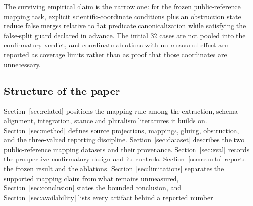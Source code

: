 The surviving empirical claim is the narrow one: for the frozen
public-reference mapping task, explicit scientific-coordinate conditions plus
an obstruction state reduce false merges relative to flat predicate
canonicalization while satisfying the false-split guard declared in advance.
The initial 32 cases are not pooled into the confirmatory verdict, and
coordinate ablations with no measured effect are reported as coverage limits
rather than as proof that those coordinates are unnecessary.

\subsection{Structure of the paper}

Section~\ref{sec:related} positions the mapping rule among the extraction,
schema-alignment, integration, stance and pluralism literatures it builds on.
Section~\ref{sec:method} defines source projections, mappings, gluing,
obstruction, and the three-valued reporting discipline. Section~\ref{sec:dataset}
describes the two public-reference mapping datasets and their provenance.
Section~\ref{sec:eval} records the prospective confirmatory design and its
controls. Section~\ref{sec:results} reports the frozen result and the
ablations. Section~\ref{sec:limitations} separates the supported mapping claim
from what remains unmeasured, Section~\ref{sec:conclusion} states the bounded
conclusion, and Section~\ref{sec:availability} lists every artifact behind a
reported number.
\endinput
